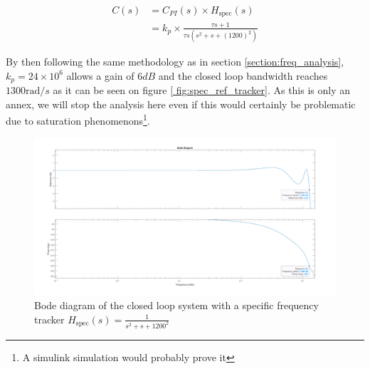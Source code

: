 \begin{align}
    C(s) &= C_{PI}(s) \times H_{\text{spec}}(s)\\
    &= k_p\times\frac{\tau s + 1}{\tau s(s^2+s+(1200)^2)}
\end{align}

By then following the same methodology as in section \ref{section:freq_analysis}, $k_p = 24\times 10^6$ allows a gain 
of $6 dB$ and the closed loop bandwidth reaches $1300 \text{rad}/s$ as it can be seen on figure \ref{
fig:spec_ref_tracker}. As this is only an annex, we will stop the analysis here even if this would certainly be 
problematic due to saturation phenomenons\footnote{A simulink simulation would probably prove it}. 

\begin{figure}[H]
    \centering
    \includegraphics[height=\textheight/3]{Pictures/annex_spec_cmplx.png}
    \caption{Bode diagram of the closed loop system with a specific frequency tracker $H_{\text{spec}}(s) = \frac{1}{s^2
    +s+1200^2}$}
    \label{fig:spec_ref_tracker}
\end{figure}


